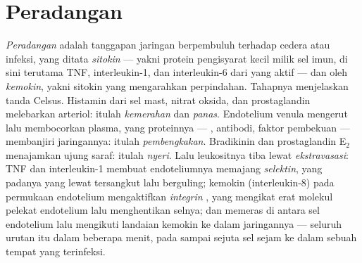 \section{Peradangan}

\begin{definition}\label{def:b3:innate-immunity:inflammation}
%
\emph{Peradangan} adalah tanggapan jaringan berpembuluh terhadap cedera atau
infeksi, yang ditata \emph{sitokin} --- yakni protein pengisyarat kecil
milik sel imun, di sini terutama TNF, interleukin-1, dan
interleukin-6 dari  yang aktif --- dan oleh \emph{kemokin},
yakni sitokin yang mengarahkan perpindahan. Tahapnya menjelaskan tanda Celsus.
Histamin dari sel mast, nitrat oksida, dan prostaglandin melebarkan
arteriol: itulah \emph{kemerahan} dan \emph{panas}. Endotelium
venula mengerut lalu membocorkan plasma, yang proteinnya --- ,
antibodi, faktor pembekuan --- membanjiri jaringannya: itulah \emph{pembengkakan}.
Bradikinin dan prostaglandin E$_{2}$ menajamkan ujung saraf:
itulah \emph{nyeri}. Lalu leukositnya tiba lewat \emph{ekstravasasi}: TNF dan
interleukin-1 membuat endoteliumnya memajang \emph{selektin}, yang padanya
 yang lewat tersangkut lalu berguling; kemokin (interleukin-8) pada
permukaan endotelium mengaktifkan \emph{integrin} , yang
mengikat erat molekul pelekat endotelium lalu menghentikan selnya; dan
 memeras di antara sel endotelium lalu mengikuti
landaian kemokin ke dalam jaringannya --- seluruh urutan itu dalam beberapa
menit, pada sampai sejuta sel sejam ke dalam sebuah tempat yang terinfeksi.
\end{definition}

